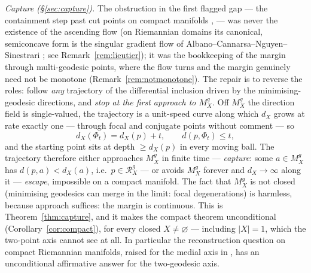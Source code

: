 \documentclass[11pt]{article}
\theoremstyle{remark}
\newcommand{\X}{X}
\newcommand{\Mg}{M^{g}_{\X}}
\newcommand{\Rg}{\mathcal{R}^{g}_{\X}}
\newcommand{\dX}{d_{\X}}
\begin{document}
\emph{Capture (\S\ref{sec:capture}).} The obstruction in the first
flagged gap --- the containment step past cut points on compact
manifolds \cite[Rem.~8.4]{Sph}, \cite[Rem.~6.5]{Tri} --- was
never the existence of the ascending flow (on Riemannian domains its
canonical, semiconcave form is the singular gradient flow of
Albano--Cannarsa--Nguyen--Sinestrari \cite{ACNS}; see
Remark~\ref{rem:lieutier}); it was the bookkeeping of
the margin through multi-geodesic points, where the flow turns and the
margin genuinely need not be monotone (Remark~\ref{rem:notmonotone}).
The repair is to reverse the roles: follow \emph{any} trajectory of
the differential inclusion driven by the minimising-geodesic
directions, and \emph{stop at the first approach to $\Mg$}. Off $\Mg$
the direction field is single-valued, the trajectory is a unit-speed
curve along which $\dX$ grows at rate exactly one --- through focal and
conjugate points without comment --- so
\[
  \dX(\Phi_{t})=\dX(p)+t,\qquad d(p,\Phi_{t})\le t,
\]
and the starting point sits at depth $\ge\dX(p)$ in every moving ball.
The trajectory therefore either approaches $\Mg$ in finite time ---
\emph{capture}: some $a\in\Mg$ has $d(p,a)<\dX(a)$, i.e.\ $p\in\Rg$ ---
or avoids $\Mg$ forever and $\dX\to\infty$ along it --- \emph{escape},
impossible on a compact manifold. The fact that $\Mg$ is not closed
(minimising geodesics can merge in the limit: focal degenerations) is
harmless, because approach suffices: the margin is continuous. This is
Theorem~\ref{thm:capture}, and it makes the compact theorem
unconditional (Corollary~\ref{cor:compact}), for every closed
$\X\neq\varnothing$ --- including $|\X|=1$, which the two-point axis
cannot see at all. In particular the reconstruction question on
compact Riemannian manifolds, raised for the medial axis in
\cite[\S5.2]{Bia}, has an unconditional affirmative answer for the
two-geodesic axis.
\end{document}
